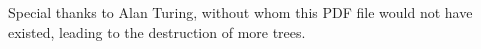 \cleardoublepage
\begin{acknowledgements}
Special thanks to Alan Turing, without whom this PDF file would not have existed, leading to the destruction of more trees.
\end{acknowledgements}